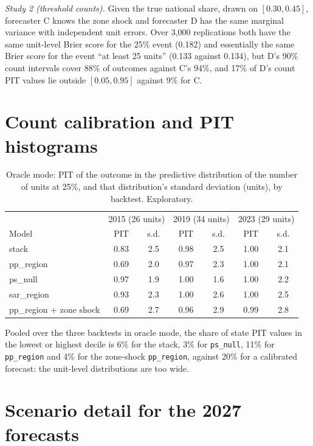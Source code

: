 \documentclass[preprint,12pt,authoryear]{elsarticle}
\begin{document}
\emph{Study 2 (threshold counts).} Given the true national share, drawn on $[0.30, 0.45]$, forecaster C knows the zone shock and forecaster D has the same marginal variance with independent unit errors. Over 3,000 replications both have the same unit-level Brier score for the 25\% event (0.182) and essentially the same Brier score for the event ``at least 25 units'' (0.133 against 0.134), but D's 90\% count intervals cover 88\% of outcomes against C's 94\%, and 17\% of D's count PIT values lie outside $[0.05, 0.95]$ against 9\% for C.

\section{Count calibration and PIT histograms}
\label{app:count}

\begin{table}[ht]
\centering
\caption{Oracle mode: PIT of the outcome in the predictive distribution of the number of units at 25\%, and that distribution's standard deviation (units), by backtest. Exploratory.}
\label{tab:count}
\small
\begin{tabular}{lcccccc}
\toprule
& \multicolumn{2}{c}{2015 (26 units)} & \multicolumn{2}{c}{2019 (34 units)} & \multicolumn{2}{c}{2023 (29 units)} \\
Model & PIT & s.d. & PIT & s.d. & PIT & s.d. \\
\midrule
stack & 0.83 & 2.5 & 0.98 & 2.5 & 1.00 & 2.1 \\
pp\_region & 0.69 & 2.0 & 0.97 & 2.3 & 1.00 & 2.1 \\
ps\_null & 0.97 & 1.9 & 1.00 & 1.6 & 1.00 & 2.2 \\
sar\_region & 0.93 & 2.3 & 1.00 & 2.6 & 1.00 & 2.5 \\
pp\_region + zone shock & 0.69 & 2.7 & 0.96 & 2.9 & 0.99 & 2.8 \\
\bottomrule
\end{tabular}
\end{table}

Pooled over the three backtests in oracle mode, the share of state PIT values in the lowest or highest decile is 6\% for the stack, 3\% for \texttt{ps\_null}, 11\% for \texttt{pp\_region} and 4\% for the zone-shock \texttt{pp\_region}, against 20\% for a calibrated forecast: the unit-level distributions are too wide.

\section{Scenario detail for the 2027 forecasts}
\label{app:scenarios}
\end{document}
